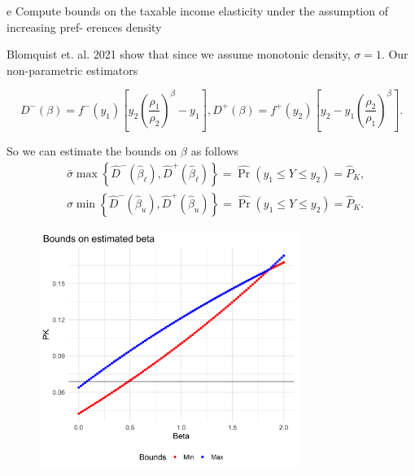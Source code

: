 \documentclass{article}
\begin{document}
\begin{problem}{e}
Compute bounds on the taxable income elasticity under the assumption of increasing pref- erences density
\end{problem}
\begin{solution}
Blomquist et. al. 2021 show that since we assume monotonic density, $\sigma=1$. Our non-parametric estimators

$$
D^{-}(\beta)=f^{-}\left(y_{1}\right)\left[y_{2}\left(\frac{\rho_{1}}{\rho_{2}}\right)^{\beta}-y_{1}\right], D^{+}(\beta)=f^{+}\left(y_{2}\right)\left[y_{2}-y_{1}\left(\frac{\rho_{2}}{\rho_{1}}\right)^{\beta}\right] .
$$

So we can estimate the bounds on $\beta$ as follows
\begin{equation}
\begin{aligned}
&\bar{\sigma} \max \left\{\hat{D}^{-}\left(\hat{\beta}_{\ell}\right), \hat{D}^{+}\left(\hat{\beta}_{\ell}\right)\right\}=\widehat{\operatorname{Pr}}\left(y_{1} \leq Y \leq y_{2}\right) = \widehat{P}_K, \\
&\sigma \min \left\{\hat{D}^{-}\left(\hat{\beta}_{u}\right), \hat{D}^{+}\left(\hat{\beta}_{u}\right)\right\}=\widehat{\operatorname{Pr}}\left(y_{1} \leq Y \leq y_{2}\right) = \widehat{P}_K .
\end{aligned}
\end{equation}

\begin{figure}[!htb]
    \centering    
    \includegraphics[width=0.75\textwidth]{ps2/4e.png}
\end{figure}



\end{solution}
\end{document}

